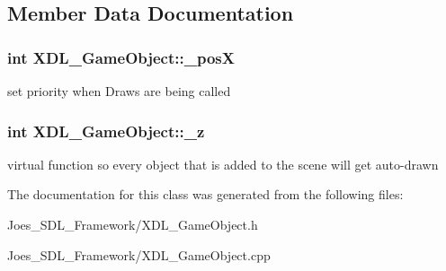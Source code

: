 \subsection{Member Data Documentation}
\hypertarget{class_x_d_l___game_object_af2dfc50f0570ac313ce58b9addc011cc}{
\subsubsection[{\-\_\-pos\-X}]{\setlength{\rightskip}{0pt plus 5cm}int X\-D\-L\-\_\-\-Game\-Object\-::\-\_\-pos\-X}}\label{class_x_d_l___game_object_af2dfc50f0570ac313ce58b9addc011cc}
set priority when Draws are being called \hypertarget{class_x_d_l___game_object_a62a08106992c783507c669f71a6dd6a6}{
\subsubsection[{\-\_\-z}]{\setlength{\rightskip}{0pt plus 5cm}int X\-D\-L\-\_\-\-Game\-Object\-::\-\_\-z}}\label{class_x_d_l___game_object_a62a08106992c783507c669f71a6dd6a6}
virtual function so every object that is added to the scene will get auto-\/drawn 

The documentation for this class was generated from the following files\-:\begin{DoxyCompactItemize}
\item 
Joes\-\_\-\-S\-D\-L\-\_\-\-Framework/X\-D\-L\-\_\-\-Game\-Object.\-h\item 
Joes\-\_\-\-S\-D\-L\-\_\-\-Framework/X\-D\-L\-\_\-\-Game\-Object.\-cpp\end{DoxyCompactItemize}
